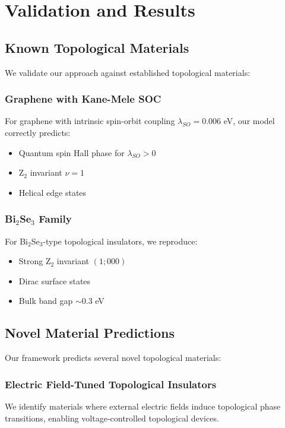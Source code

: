 \documentclass[12pt,a4paper]{article}
\begin{document}
\section{Validation and Results}

\subsection{Known Topological Materials}

We validate our approach against established topological materials:

\subsubsection{Graphene with Kane-Mele SOC}

For graphene with intrinsic spin-orbit coupling $\lambda_{SO} = 0.006$ eV, our model correctly predicts:
\begin{itemize}
\item Quantum spin Hall phase for $\lambda_{SO} > 0$
\item Z$_2$ invariant $\nu = 1$
\item Helical edge states
\end{itemize}

\subsubsection{Bi$_2$Se$_3$ Family}

For Bi$_2$Se$_3$-type topological insulators, we reproduce:
\begin{itemize}
\item Strong Z$_2$ invariant $(1;000)$
\item Dirac surface states
\item Bulk band gap $\sim 0.3$ eV
\end{itemize}

\subsection{Novel Material Predictions}

Our framework predicts several novel topological materials:

\subsubsection{Electric Field-Tuned Topological Insulators}

We identify materials where external electric fields induce topological phase transitions, enabling voltage-controlled topological devices.
\end{document}
